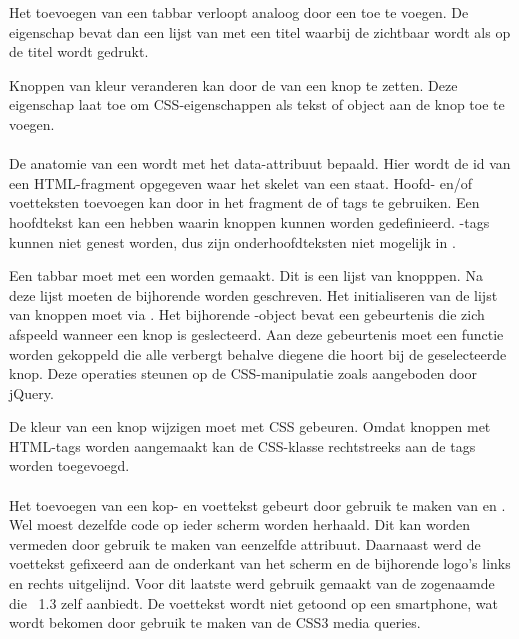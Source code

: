Het toevoegen van een tabbar verloopt analoog door een  toe te voegen.
De  eigenschap bevat dan een lijst van  met een titel waarbij de  zichtbaar wordt als op de titel wordt gedrukt.

Knoppen van kleur veranderen kan door de  van een knop te zetten.
Deze eigenschap laat toe om CSS-eigenschappen als tekst of object aan de knop toe te voegen.

\paragraph{\kendo}
De anatomie van een  wordt met het data-attribuut  bepaald.
Hier wordt de id van een HTML-fragment opgegeven waar het skelet van een  staat.
Hoofd- en/of voetteksten toevoegen kan door in het fragment de  of  tags te gebruiken.
Een hoofdtekst kan een  hebben waarin knoppen kunnen worden gedefinieerd.
-tags kunnen niet genest worden, dus zijn onderhoofdteksten niet mogelijk in \kendo{}.

Een tabbar moet met een  worden gemaakt.
Dit is een lijst van knopppen.
Na deze lijst moeten de bijhorende  worden geschreven.
Het initialiseren van de lijst van knoppen moet via .
Het bijhorende \js-object bevat een  gebeurtenis die zich afspeeld wanneer een knop is geslecteerd.
Aan deze gebeurtenis moet een functie worden gekoppeld die alle  verbergt behalve diegene die hoort bij de geselecteerde knop.
Deze operaties steunen op de CSS-manipulatie zoals aangeboden door jQuery.

De kleur van een knop wijzigen moet met CSS gebeuren.
Omdat knoppen met HTML-tags worden aangemaakt kan de CSS-klasse rechtstreeks aan de tags worden toegevoegd.

\paragraph{\jqm}
Het toevoegen van een kop- en voettekst gebeurt door gebruik te maken van  en . 
Wel moest dezelfde code op ieder scherm worden herhaald. 
Dit kan worden vermeden door gebruik te maken van eenzelfde  attribuut. 
Daarnaast werd de voettekst gefixeerd aan de onderkant van het scherm en de bijhorende logo's links en rechts uitgelijnd. 
Voor dit laatste werd gebruik gemaakt van de zogenaamde  die \jqm{}~1.3 zelf aanbiedt. 
De voettekst wordt niet getoond op een smartphone, wat wordt bekomen door gebruik te maken van de CSS3 media queries.

